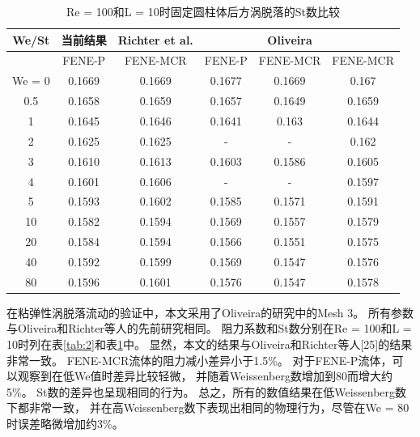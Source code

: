 \documentclass[UTF8,zihao=5]{ctexart} %
\begin{document}
\begin{table}[htbp]
    \begin{center}
        \caption{Re = 100和L = 10时固定圆柱体后方涡脱落的St数比较}
        \label{tab:3}
        \begin{tabular}{cccccc}
            \hline
            We/St  & 当前结果 & Richter et al. &        & Oliveira            \\
            \hline
                   & FENE-P   & FENE-MCR       & FENE-P & FENE-MCR & FENE-MCR \\
            We = 0 & 0.1669   & 0.1669         & 0.1677 & 0.1669   & 0.167    \\
            0.5    & 0.1658   & 0.1659         & 0.1657 & 0.1649   & 0.1659   \\
            1      & 0.1645   & 0.1646         & 0.1641 & 0.163    & 0.1644   \\
            2      & 0.1625   & 0.1625         & -      & -        & 0.162    \\
            3      & 0.1610   & 0.1613         & 0.1603 & 0.1586   & 0.1605   \\
            4      & 0.1601   & 0.1606         & -      & -        & 0.1597   \\
            5      & 0.1593   & 0.1602         & 0.1585 & 0.1571   & 0.1591   \\
            10     & 0.1582   & 0.1594         & 0.1569 & 0.1557   & 0.1579   \\
            20     & 0.1584   & 0.1594         & 0.1566 & 0.1551
                   & 0.1575                                                   \\
            40     & 0.1592   & 0.1599         & 0.1569 & 0.1547   & 0.1576   \\
            80     & 0.1596   & 0.1601         & 0.1576 & 0.1547   & 0.1578   \\
            \hline
        \end{tabular}
    \end{center}
\end{table}

在粘弹性涡脱落流动的验证中，本文采用了Oliveira的研究中的Mesh 3。
所有参数与Oliveira和Richter等人的先前研究相同。
阻力系数和St数分别在Re = 100和L = 10时列在表\ref{tab:2}和表\ref{tab:3}中。
显然，本文的结果与Oliveira和Richter等人[25]的结果非常一致。
FENE-MCR流体的阻力减小差异小于1.5\%。
对于FENE-P流体，可以观察到在低We值时差异比较轻微，
并随着Weissenberg数增加到80而增大约5\%。
St数的差异也呈现相同的行为。
总之，所有的数值结果在低Weissenberg数下都非常一致，
并在高Weissenberg数下表现出相同的物理行为，尽管在We = 80时误差略微增加约3\%。
\end{document}
